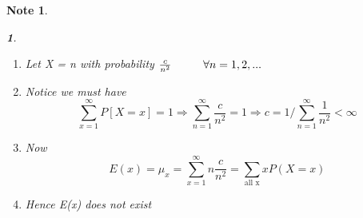 \documentclass[11pt]{article}
\newtheorem*{note}{Note}
\newtheorem{example}{\framebox{Ex}}[section]
\newcommand\tab[1][1cm]{\hspace*{#1}}
\begin{document}
\begin{note}
\begin{enumerate}
\begin{example}
                            \begin{enumerate}
                                \item Let X = n with probability $\frac{c}{n^2} \tab \forall n = 1, 2, ...$
                                \item Notice we must have \[\sum\limits_{x=1}^{\infty} P[X = x] = 1 \Rightarrow \sum\limits_{n=1}^{\infty} \frac{c}{n^2}  = 1 \Rightarrow c = 1 / \sum\limits_{n=1}^{\infty} \frac{1}{n^2} < \infty \]
                                \item Now \[E(x) = \mu_x = \sum\limits_{x=1}^{\infty} n \frac{c}{n^2 }  = \sum\limits_{\text{all x}} xP(X=x)\tag{which diverges}\]
                                \item Hence E(x) does not exist
                            \end{enumerate} 
                        \end{example}
                \end{enumerate}
            \end{note}
            \newpage
\end{document}
